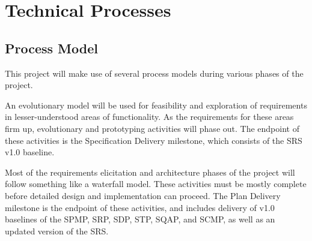 \documentclass[11pt]{article}
\begin{document}




\section{Technical Processes}
\subsection{Process Model}
This project will make use of several process models during various phases of the project.

An evolutionary model will be used for feasibility and exploration of requirements in
lesser-understood areas of functionality.  As the requirements for these areas firm up, evolutionary
and prototyping activities will phase out.  The endpoint of these activities is the Specification
Delivery milestone, which consists of the SRS v1.0 baseline.

Most of the requirements elicitation and architecture phases of the project will follow something
like a waterfall model.  These activities must be mostly complete before detailed design and
implementation can proceed.  The Plan Delivery milestone is the endpoint of these activities, and
includes delivery of v1.0 baselines of the SPMP, SRP, SDP, STP, SQAP, and SCMP, as well as an
updated version of the SRS.
\end{document}
